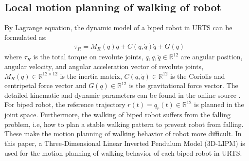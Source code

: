 \documentclass[journal,12pt,onecolumn,draftclsnofoot,]{IEEEtran}
\begin{document}


\subsection{Local motion planning of walking of robot}
By Lagrange equation, the dynamic model of a biped robot in URTS can be formulated as:
\begin{equation} \label{eq:robot} 
    \begin{split}
        & \tau_R = M_R(q)\ddot{q} + C(q,\dot{q})\dot{q} + G(q)    
    \end{split}
\end{equation}
where $\tau_R$ is the total torque on revolute joints, $q,\dot{q},\ddot{q}\in\mathbb{R}^{12}$  are angular position, angular velocity, and angular acceleration vector of revolute joints, $M_R(q)\in\mathbb{R}^{12\times 12}$ is the inertia matrix, $C(q,\dot{q})\in\mathbb{R}^{12}$ is the Coriolis and centripetal force vector and $G(q)\in\mathbb{R}^{12}$ is the gravitational force vector. The detailed kinematic and dynamic parameters can be found in the online source \cite{ourrobot}. For biped robot, the reference trajectory $r(t)=q_r(t)\in\mathbb{R}^{12}$ is planned in the joint space. Furthermore, the walking of biped robot suffers from the falling problem, i.e, how to plan a stable walking pattern to prevent robot from falling. These make the motion planning of walking behavior of robot more difficult. In this paper, a Three-Dimensional Linear Inverted Pendulum Model (3D-LIPM) \cite{kajita2001real} is used for the motion planning of walking behavior of each biped robot in URTS.
\end{document}
